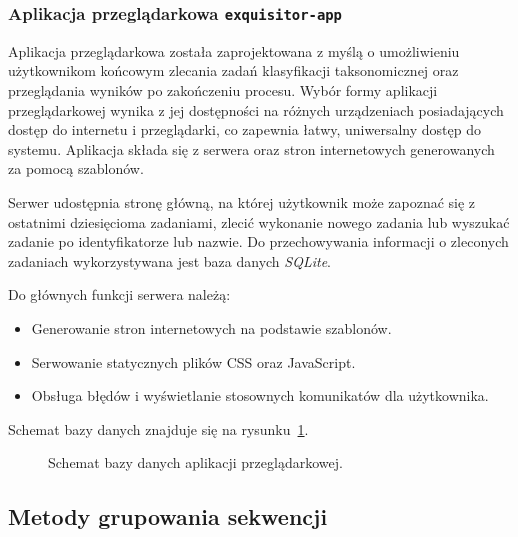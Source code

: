         \subsubsection{Aplikacja przeglądarkowa \texttt{exquisitor-app}}
            Aplikacja przeglądarkowa została zaprojektowana z myślą o umożliwieniu użytkownikom końcowym zlecania zadań klasyfikacji taksonomicznej oraz przeglądania wyników po zakończeniu procesu. Wybór formy aplikacji przeglądarkowej wynika z jej dostępności na różnych urządzeniach posiadających dostęp do internetu i przeglądarki, co zapewnia łatwy, uniwersalny dostęp do systemu. Aplikacja składa się z serwera oraz stron internetowych generowanych za pomocą szablonów.

            Serwer udostępnia stronę główną, na której użytkownik może zapoznać się z ostatnimi dziesięcioma zadaniami, zlecić wykonanie nowego zadania lub wyszukać zadanie po identyfikatorze lub nazwie. Do przechowywania informacji o zleconych zadaniach wykorzystywana jest baza danych \textit{SQLite}.
            
            Do głównych funkcji serwera należą:
            \begin{itemize}
                \item Generowanie stron internetowych na podstawie szablonów.
                \item Serwowanie statycznych plików CSS oraz JavaScript.
                \item Obsługa błędów i wyświetlanie stosownych komunikatów dla użytkownika.
            \end{itemize}
            
            Schemat bazy danych znajduje się na rysunku~\ref{Picture:App:Database}.

            \begin{figure}
                \begin{center}
                    
                \end{center}
                \caption{
                    Schemat bazy danych aplikacji przeglądarkowej.
                }\label{Picture:App:Database}
            \end{figure}

    \subsection{Metody grupowania sekwencji}

